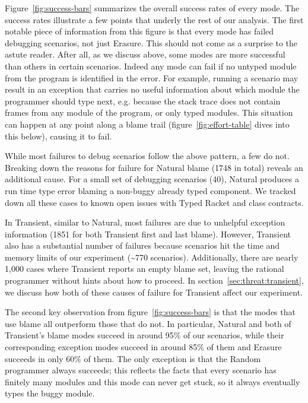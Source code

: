Figure~\ref{fig:success-bars} summarizes the overall success rates of every mode.
The success rates illustrate a few points that underly the rest of our analysis.
The first notable piece of information from
this figure is that every mode has failed debugging scenarios, not just
Erasure. This should
not come as a surprise to the astute
reader. After all, as we
discuss above, some modes are more successful than others in certain
scenarios. Indeed any mode can fail if no untyped module from the program is identified in the error.
For example, running a scenario may result in an
exception that carries no useful information about which
module the programmer should type next, e.g. because the stack trace
does not contain frames from any module of the program, or only typed modules. This situation
can happen at any point along a blame trail (figure~\ref{fig:effort-table} dives into this below), causing it to fail.

While most failures to debug scenarios follow the above pattern, a few do not.
Breaking down the reasons for failure for Natural blame (1748 in total)
reveals an additional cause. For a small set of
debugging scenarios (40), Natural produces a run time type error
blaming a non-buggy already typed
component. We tracked down all these cases to known open issues with Typed
Racket and class contracts. 

In Transient, similar to Natural,
most failures are due to unhelpful exception information (1851 for both
Transient first and last blame).  
However, Transient also has a substantial
number of failures because scenarios hit the time and memory
limits of our experiment (\textasciitilde770 scenarios).  Additionally, there are nearly 1,000 cases where
Transient reports an empty blame set, leaving the rational programmer
without hints about how to proceed.
In section~\ref{sec:threat:transient}, we discuss how both of these causes of
failure for Transient affect our experiment. 

The second key observation from figure~\ref{fig:success-bars} is that the modes that use blame all outperform those that do not.
In particular, Natural and both of Transient's blame modes succeed in around 95\% of our scenarios, while their corresponding exception modes succeed in around 85\% of them and Erasure succeeds in only 60\% of them.
The only exception is that the Random programmer always succeeds;
this reflects the facts that every scenario has finitely many modules and this mode can never get stuck, so it always eventually types the buggy module.


